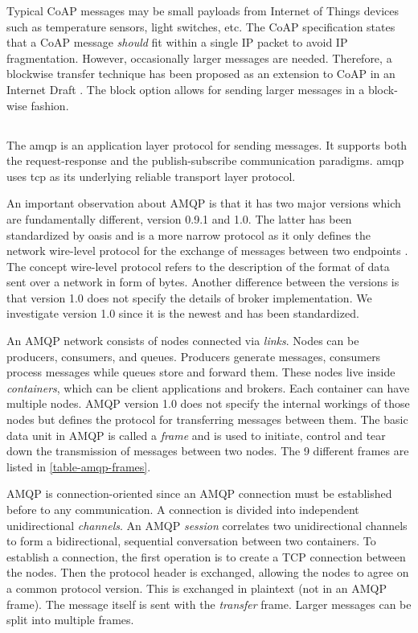 Typical CoAP messages may be small payloads from Internet of Things devices such
as temperature sensors, light switches, etc. The CoAP specification states that
a CoAP message \textit{should} fit within a single IP packet to avoid IP
fragmentation. However, occasionally larger messages are needed. Therefore, a
blockwise transfer technique has been proposed as an extension to CoAP in an
Internet Draft \cite{draft-coap-blockwise}. The block option allows for sending
larger messages in a block-wise fashion.

\subsection{}

The \gls{amqp} is an application layer protocol for sending messages.
It supports both the request-response and the publish-subscribe communication
paradigms. \gls{amqp} uses \gls{tcp} as its underlying reliable transport layer
protocol.

An important observation about AMQP is that it has two major versions which are
fundamentally different, version 0.9.1 and 1.0. The latter has been standardized
by \gls{oasis} and is a  more narrow protocol as it only defines the network
wire-level protocol for the exchange of messages between two endpoints
\cite{oasis-amqp}. The concept wire-level protocol refers to the description of
the format of data sent over a network in form of bytes. Another difference
between the versions is that version 1.0 does not specify the details of broker
implementation. We investigate version 1.0 since it is the newest and has been
standardized.

An AMQP network consists of nodes connected via \textit{links}. Nodes can be
producers, consumers, and queues. Producers generate messages, consumers process
messages while queues store and forward them. These nodes live inside
\textit{containers}, which can be client applications and brokers. Each
container can have multiple nodes. AMQP version 1.0 does not specify the
internal workings of those nodes but defines the protocol for transferring
messages between them. The basic data unit in AMQP is called a \textit{frame}
and is used to initiate, control and tear down the transmission of messages
between two nodes. The 9 different frames are listed in
\cref{table-amqp-frames}.

AMQP is connection-oriented since an AMQP connection must be established before
to any communication. A connection is divided into independent unidirectional
\textit{channels}. An AMQP \textit{session} correlates two unidirectional
channels to form a bidirectional, sequential conversation between two
containers. To establish a connection, the first operation is to create a TCP
connection between the nodes. Then the protocol header is exchanged, allowing
the nodes to agree on a common protocol version. This is exchanged in plaintext
(not in an AMQP frame). The message itself is sent with the \textit{transfer}
frame. Larger messages can be split into multiple frames.


